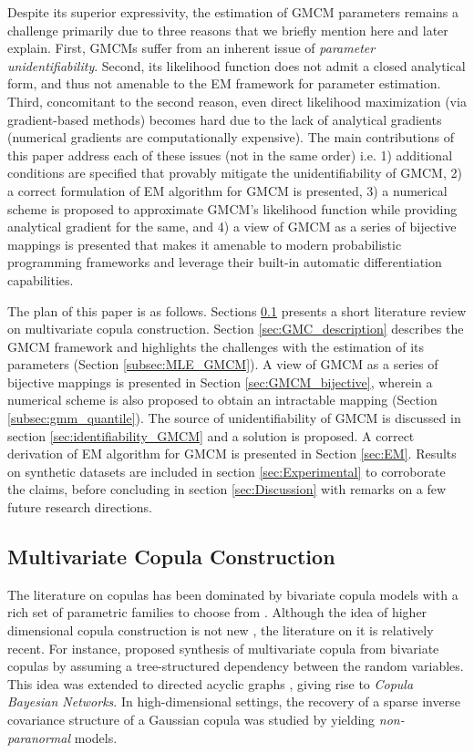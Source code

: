 \documentclass{article}
\theoremstyle{plain}
\theoremstyle{definition}
\theoremstyle{remark}
\begin{document}
Despite its superior expressivity, the estimation of GMCM parameters remains a challenge primarily due to three reasons that we briefly mention here and later explain. First, GMCMs suffer from an inherent issue of \emph{parameter unidentifiability}. Second, its likelihood function does not admit a closed analytical form, and thus not amenable to the EM framework for parameter estimation. Third, concomitant to the second reason, even direct likelihood maximization (via gradient-based methods) becomes hard due to the lack of analytical gradients (numerical gradients are computationally expensive). The main contributions of this paper address each of these issues (not in the same order) i.e. 1) additional conditions are specified that provably mitigate the unidentifiability of GMCM, 2) a correct formulation of EM algorithm for GMCM is presented, 3) a numerical scheme is proposed to approximate GMCM's likelihood function while providing analytical gradient for the same, and 4) a view of GMCM as a series of bijective mappings is presented that makes it amenable to modern probabilistic programming frameworks and leverage their built-in automatic differentiation capabilities.

The plan of this paper is as follows. Sections \ref{subsec:LitReview} presents a short literature review on multivariate copula construction. Section \ref{sec:GMC_description} describes the GMCM framework and highlights the challenges with the estimation of its parameters (Section \ref{subsec:MLE_GMCM}). A view of GMCM as a series of bijective mappings is presented in Section \ref{sec:GMCM_bijective}, wherein a numerical scheme is also proposed to obtain an intractable mapping (Section \ref{subsec:gmm_quantile}). The source of unidentifiability of GMCM is discussed in section \ref{sec:identifiability_GMCM} and a solution is proposed. A correct derivation of EM algorithm for GMCM is presented in Section \ref{sec:EM}. Results on synthetic datasets are included in section \ref{sec:Experimental} to corroborate the claims, before concluding in section \ref{sec:Discussion} with remarks on a few future research directions.

\subsection{Multivariate Copula Construction}\label{subsec:LitReview}
The literature on copulas has been dominated by bivariate copula models with a rich set of parametric families to choose from \citep{Nelsen1999introduction}. Although the idea of higher dimensional copula construction is not new \citep[see][]{Genest1995Multivariate, Joe1993Multivariate,Kojadinovic2010RpackageMVcopula}, the literature on it is relatively recent. For instance, \citet{Bedford2002,Kurowicka2009Book,Czado2010PairCopula} proposed  synthesis of multivariate copula from bivariate copulas by assuming a tree-structured dependency between the random variables. This idea was extended to directed acyclic graphs \citep[see][]{Elidan2010,Hanea2006CBN},  giving rise to \emph{Copula Bayesian Networks}. In high-dimensional settings, the recovery of a sparse inverse covariance structure of a Gaussian copula was studied by \citet{Liu2009} yielding  \emph{non-paranormal} models.
\end{document}
